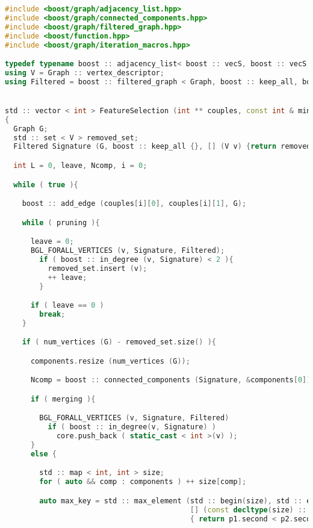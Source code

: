 \documentclass{standalone}
\begin{document}
\lstset{style=c++}
\begin{lstlisting}[language=C++, caption=DNetPRO signature extraction, label=code:featuresel]
#include <boost/graph/adjacency_list.hpp>
#include <boost/graph/connected_components.hpp>
#include <boost/graph/filtered_graph.hpp>
#include <boost/function.hpp>
#include <boost/graph/iteration_macros.hpp>

typedef typename boost :: adjacency_list< boost :: vecS, boost :: vecS, boost :: undirectedS, boost :: property< boost :: vertex_color_t, int >, boost :: property < boost :: edge_index_t, int > > Graph;
using V = Graph :: vertex_descriptor;
using Filtered = boost :: filtered_graph < Graph, boost :: keep_all, boost :: function < bool(V) > >;


std :: vector < int > FeatureSelection (int ** couples, const int & min_size, bool pruning=true, bool merging=true)
{
  Graph G;
  std :: set < V > removed_set;
  Filtered Signature (G, boost :: keep_all {}, [] (V v) {return removed_set.end() == removed_set.find(v);});

  int L = 0, leave, Ncomp, i = 0;

  while ( true ){

    boost :: add_edge (couples[i][0], couples[i][1], G);

    while ( pruning ){

      leave = 0;
      BGL_FORALL_VERTICES (v, Signature, Filtered);
        if ( boost :: in_degree (v, Signature) < 2 ){
          removed_set.insert (v);
          ++ leave;
        }

      if ( leave == 0 )
        break;
    }

    if ( num_vertices (G) - removed_set.size() ){

      components.resize (num_vertices (G));

      Ncomp = boost :: connected_components (Signature, &components[0]);

      if ( merging ){

        BGL_FORALL_VERTICES (v, Signature, Filtered)
          if ( boost :: in_degree(v, Signature) )
            core.push_back ( static_cast < int >(v) );
      }
      else {

        std :: map < int, int > size;
        for ( auto && comp : components ) ++ size[comp];

        auto max_key = std :: max_element (std :: begin(size), std :: end(size),
                                           [] (const decltype(size) :: value_type && p1, const decltype(size) :: value_type && p2)
                                           { return p1.second < p2.second; })->first;


\end{lstlisting}
\end{document}
